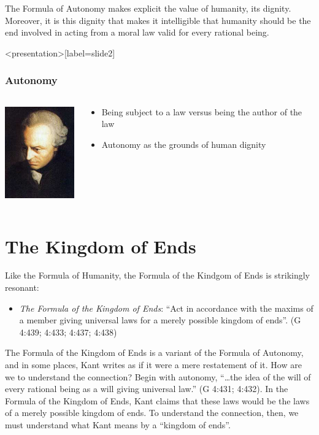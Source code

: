 The Formula of Autonomy makes explicit the value of humanity, its dignity. Moreover, it is this dignity that makes it intelligible that humanity should be the end involved in acting from a moral law valid for every rational being. \change

\begin{frame}<presentation>[label=slide2]
    \frametitle{Autonomy}
        \begin{columns}
            \begin{column}{3cm}
                \includegraphics[height=4cm]{../../graphics/kant.jpg}
            \end{column}
            \begin{column}{7cm}
                \begin{itemize}
                    \item \alert{Being subject to a law} versus \alert{being the author of the law}
                    \item Autonomy as the grounds of human dignity
                \end{itemize}
            \end{column}
        \end{columns}
\end{frame}

\section{The Kingdom of Ends}

Like the Formula of Humanity, the Formula of the Kindgom of Ends is strikingly resonant:
\begin{itemize}
    \item \emph{The Formula of the Kingdom of Ends}: ``Act in accordance with the maxims of a member giving universal laws for a merely possible kingdom of ends''. (G 4:439; 4:433; 4:437; 4:438)
\end{itemize}

The Formula of the Kingdom of Ends is a variant of the Formula of Autonomy, and in some places, Kant writes as if it were a mere restatement of it. How are we to understand the connection? Begin with autonomy, ``\ldots the idea of the will of every rational being as a will giving universal law.'' (G 4:431; 4:432). In the Formula of the Kingdom of Ends, Kant claims that these laws would be the laws of a merely possible kingdom of ends. To understand the connection, then, we must understand what Kant means by a ``kingdom of ends''.

